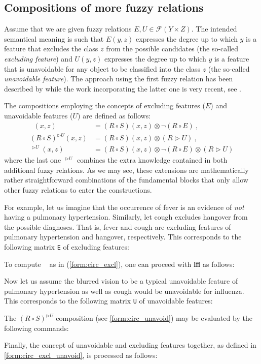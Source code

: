 \documentclass[review]{elsarticle}
\newcommand{\pkg}[1]{\textbf{#1}}
\newcommand{\code}[1]{\texttt{#1}}
\newcommand{\RSE}{\mathop{(R\circ S^{\backprime}E)}\nolimits}
\begin{document}
\subsection{Compositions of more fuzzy relations}

Assume that we are given fuzzy relations $E,U\in\mathcal{F}(Y\times Z)$. The intended semantical meaning is such that $E(y,z)$ expresses the degree up to which $y$ is a feature that excludes the class $z$ from the possible candidates (the so-called \emph{excluding feature}) and $U(y,z)$ expresses the degree up to which $y$ is a feature that is unavoidable for any object to be classified into the class $z$ (the so-called \emph{unavoidable feature}). The approach using the first fuzzy relation has been described by \cite{CaoStep:ExcludfeatureESWA} while the work incorporating the latter one is very recent, see \cite{Step_etal:Unavoidable_KNOSYS2020}.

The compositions employing the concepts of excluding features ($E$) and unavoidable features ($U$) are defined as follows:
\begin{align}
    \RSE(x,z) & = (R\circ S) (x,z) \otimes \neg (R\circ E)\ ,\label{form:circ_excl}\\
    (R\circ S)^{\rhd U}(x,z) & = (R\circ S) (x,z) \otimes  (R\rhd U)\ ,  \label{form:circ_unavoid}\\
    \RSE^{\rhd U}(x,z) & = (R\circ S) (x,z) \otimes \neg (R\circ E) \otimes (R\rhd U)  \label{form:circ_excl_unavoid}
\end{align}
where the last one $\RSE^{\rhd U}$ combines the extra knowledge contained in both additional fuzzy relations. As we may see, these extensions are mathematically rather straightforward combinations of the fundamental blocks that only allow other fuzzy relations to enter the constructions.


For example, let us imagine that the occurrence of fever is an evidence of \emph{not} having a pulmonary hypertension. Similarly, let cough excludes hangover from the possible diagnoses. That is, fever and cough are excluding features of pulmonary hypertension and hangover, respectively. This corresponds to the following matrix \code{E} of excluding features:
%

%
To compute $\RSE$ as in (\ref{form:circ_excl}), one can proceed with \pkg{lfl} as follows:
%

%
Now let us assume the blurred vision to be a typical unavoidable feature of pulmonary hypertension as well as cough would be unavoidable for influenza. This corresponds to the following matrix \code{U} of unavoidable features:
%

%
The $(R\circ S)^{\rhd U}$ composition (see \eqref{form:circ_unavoid}) may be evaluated by the following commands: 
%

%
Finally, the concept of unavoidable and excluding features together, as defined in \eqref{form:circ_excl_unavoid}, is processed as follows:
%

\end{document}
